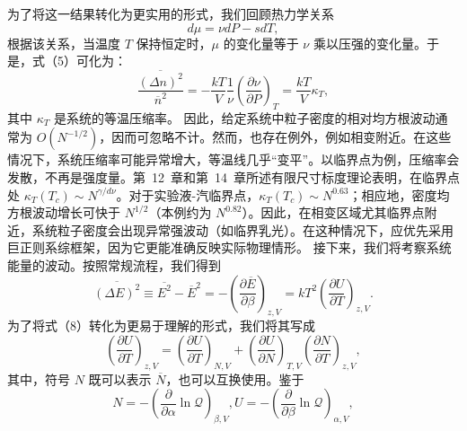 为了将这一结果转化为更实用的形式，我们回顾热力学关系
\begin{equation}\tag{4.5.6}\label{eq:4.5.6}
d \mu = \nu d P - s d T ,
\end{equation}
根据该关系，当温度 \(T\) 保持恒定时，\(\mu\) 的变化量等于 \(\nu\) 乘以压强的变化量。于是，式（5）可化为：
\begin{equation}\tag{4.5.7}\label{eq:4.5.7}
\frac { \overline { { ( \Delta n ) ^{2} } } } { \overline { { n } } ^{2} } = - \frac { k T } { V } \frac { 1 } { \nu } \left( \frac { \partial \nu } { \partial P } \right) _ { T } = \frac { k T } { V } \kappa _ { T } ,
\end{equation}
其中 \(\kappa_{T}\) 是系统的等温压缩率。
因此，给定系统中粒子密度的相对均方根波动通常为 \(O(N^{-1/2})\)，因而可忽略不计。然而，也存在例外，例如相变附近。在这些情况下，系统压缩率可能异常增大，等温线几乎“变平”。以临界点为例，压缩率会发散，不再是强度量。第~12~章和第~14~章所述有限尺寸标度理论表明，在临界点处 \(\kappa_{T}(T_{c}) \sim N^{\gamma / d \nu}\)。对于实验液-汽临界点，\(\kappa_{T}(T_{c}) \sim N^{0.63}\)；相应地，密度均方根波动增长可快于 \(N^{1/2}\)（本例约为 \(N^{0.82}\)）。因此，在相变区域尤其临界点附近，系统粒子密度会出现异常强波动（如临界乳光）。在这种情况下，应优先采用巨正则系综框架，因为它更能准确反映实际物理情形。
接下来，我们将考察系统能量的波动。按照常规流程，我们得到
\begin{equation}\tag{4.5.8}\label{eq:4.5.8}
\overline { { ( \Delta E ) ^{2} } } \equiv \overline { { E ^{2} } } - \overline { { E } } ^{2} = - \left( \frac { \partial \overline { { E } } } { \partial \beta } \right) _ { z , V } = k T ^{2} \left( \frac { \partial U } { \partial T } \right) _ { z , V } .
\end{equation}
为了将式（8）转化为更易于理解的形式，我们将其写成
\begin{equation}\tag{4.5.9}\label{eq:4.5.9}
\left( \frac { \partial U } { \partial T } \right) _ { z , V } = \left( \frac { \partial U } { \partial T } \right) _ { N , V } + \left( \frac { \partial U } { \partial N } \right) _ { T , V } \left( \frac { \partial N } { \partial T } \right) _ { z , V } ,
\end{equation}
其中，符号 \(N\) 既可以表示 \(\overline{N}\)，也可以互换使用。鉴于
\begin{equation}\tag{4.5.10}\label{eq:4.5.10}
N = - \left( \frac { \partial } { \partial \alpha } \ln \mathcal { Q } \right) _ { \beta , V } ,  U = - \left( \frac { \partial } { \partial \beta } \ln \mathcal { Q } \right) _ { \alpha , V } ,
\end{equation}
